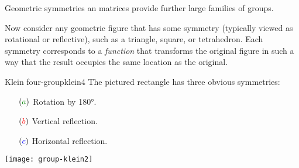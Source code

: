 Geometric symmetries an matrices provide further large families of groups. 

Now consider any geometric figure that has some symmetry (typically viewed as rotational or reflective), such as a triangle, square, or tetrahedron. Each symmetry corresponds to a \emph{function} that transforms the original figure in such a way that the result occupies the same location as the original.

\begin{example}{Klein four-group}{klein4}
	The pictured rectangle has three obvious symmetries:\par
	\begin{minipage}[t]{0.65\linewidth}\vspace{0pt}
		 \begin{itemize}\itemsep2pt
		   \item[$(\textcolor{Green}{a})$] Rotation by \ang{180}.
		   \item[$(\textcolor{red}{b})$] Vertical reflection.
		   \item[$(\textcolor{blue}{c})$] Horizontal reflection.
		 \end{itemize}
	\end{minipage}
	\hfill
	\begin{minipage}[t]{0.34\linewidth}\vspace{-6pt}
		\flushright\texttt{[image: group-klein2]}
	\end{minipage}\par
	

\end{example}

